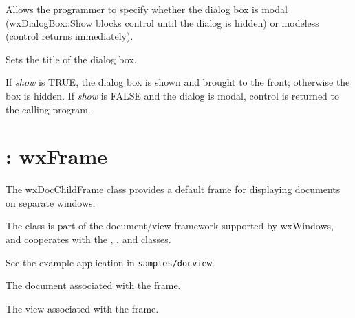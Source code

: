 
Allows the programmer to specify whether the dialog box is modal (wxDialogBox::Show blocks control
until the dialog is hidden) or modeless (control returns immediately).



Sets the title of the dialog box.



If {\it show} is TRUE, the dialog box is shown and brought to the front;
otherwise the box is hidden. If {\it show} is FALSE and the dialog is
modal, control is returned to the calling program.



\section{: wxFrame}\label{wxdocchildframe}


The wxDocChildFrame class provides a default frame for displaying documents
on separate windows.

The class is part of the document/view framework supported by wxWindows,
and cooperates with the , ,
\rtfsp{} and  classes.

See the example application in {\tt samples/docview}.



The document associated with the frame.



The view associated with the frame.



